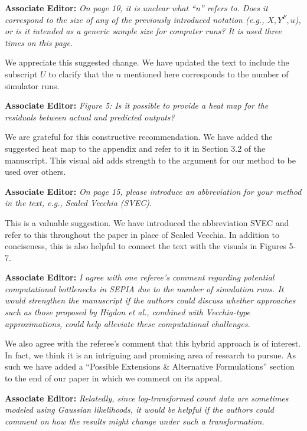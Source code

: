 \documentclass[12pt]{article}
\begin{document}
\bigskip
\noindent
\textbf{Associate Editor:} \textit{On page 10, it is unclear what ``n'' refers
to. Does it correspond to the size of any of the previously introduced
notation (e.g., \(X, Y^F, u\)), or is it intended as a generic sample size for
computer runs? It is used three times on this page.}

\bigskip
\noindent
We appreciate this suggested change. We have updated the text to include the
subscript $U$ to clarify that the $n$ mentioned here corresponds to the number
of simulator runs.

\bigskip
\noindent
\textbf{Associate Editor:} \textit{Figure 5: Is it possible to provide a heat
map for the residuals between actual and predicted outputs?}

\bigskip
\noindent
We are grateful for this constructive recommendation. We have added the
suggested heat map to the appendix and refer to it in Section 3.2 of the
manuscript. This visual aid adds strength to the argument for our method to be
used over others.

\bigskip
\noindent
\textbf{Associate Editor:} \textit{On page 15, please introduce an abbreviation
for your method in the text, e.g., Scaled Vecchia (SVEC).}

\bigskip
\noindent
This is a valuable suggestion. We have introduced the abbreviation SVEC and
refer to this throughout the paper in place of Scaled Vecchia. In addition to
conciseness, this is also helpful to connect the text with the visuals in
Figures 5-7.

\bigskip
\noindent
\textbf{Associate Editor:} \textit{I agree with one referee’s comment regarding
potential computational bottlenecks in SEPIA due to the number of simulation
runs. It would strengthen the manuscript if the authors could discuss whether
approaches such as those proposed by Higdon et al., combined with Vecchia-type
approximations, could help alleviate these computational challenges.}

\bigskip
\noindent
We also agree with the referee's comment that this hybrid approach is of
interest. In fact, we think it is an intriguing and promising area of research
to pursue. As such we have added a ``Possible Extensions \& Alternative
Formulations'' section to the end of our paper in which we comment on its
appeal.

\bigskip
\noindent
\textbf{Associate Editor:} \textit{Relatedly, since log-transformed count data
are sometimes modeled using Gaussian likelihoods, it would be helpful if the
authors could comment on how the results might change under such a
transformation.}
\end{document}
